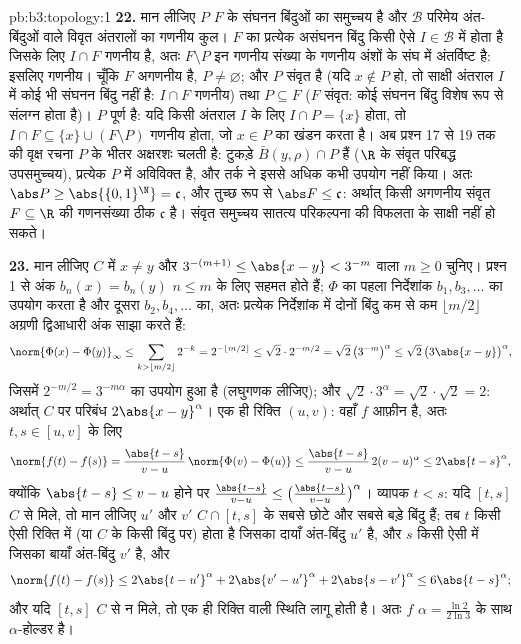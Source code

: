 \begin{solution}{pb:b3:topology:1}
\textbf{22.} मान लीजिए $P$ $F$ के संघनन बिंदुओं का समुच्चय है
और $\mathcal B$ परिमेय अंत-बिंदुओं वाले विवृत अंतरालों का गणनीय कुल। $F$
का प्रत्येक असंघनन बिंदु किसी ऐसे $I \in \mathcal B$ में होता है जिसके लिए $I \cap F$
गणनीय है, अतः $F
\setminus P$ इन गणनीय संख्या के गणनीय अंशों के संघ में
अंतर्विष्ट है: इसलिए गणनीय। चूँकि $F$ अगणनीय है, $P \neq \varnothing$; और $P$
संवृत है (यदि $x \notin P$ हो, तो साक्षी अंतराल $I$ में कोई भी संघनन
बिंदु नहीं है: $I \cap F$ गणनीय) तथा $P \subseteq F$ ($F$ संवृत: कोई संघनन बिंदु
विशेष रूप से संलग्न होता है)। $P$ पूर्ण है: यदि किसी अंतराल $I$
के लिए $I \cap P = \{x\}$ होता, तो $I \cap F \subseteq \{x\} \cup (F \setminus P)$ गणनीय होता, जो $x \in P$ का खंडन करता है।
अब प्रश्न 17 से 19 तक की वृक्ष रचना $P$ के भीतर अक्षरशः चलती है:
टुकड़े $\bar B(y, \rho) \cap P$  हैं ($\R$ के संवृत परिबद्ध उपसमुच्चय), प्रत्येक
 $P$ में अविविक्त है, और तर्क ने इससे अधिक कभी उपयोग नहीं
किया। अतः $\abs P \geq
\abs{\{0,1\}^\N} = \mathfrak c$, और तुच्छ रूप से $\abs F \leq \mathfrak
c$: अर्थात् किसी अगणनीय संवृत
$F \subseteq \R$ की गणनसंख्या ठीक $\mathfrak c$ है। संवृत समुच्चय सातत्य परिकल्पना की
विफलता के साक्षी नहीं हो सकते।

\textbf{23.} मान लीजिए $C$ में $x \neq y$ और $3^{-(m+1)} \leq \abs{x - y} < 3^{-m}$ वाला $m \geq 0$ चुनिए।
प्रश्न 1 से अंक $b_n(x) = b_n(y)$ $n \leq m$ के लिए सहमत होते हैं; $\Phi$ का पहला
निर्देशांक $b_1, b_3, \dots$ का उपयोग करता है और दूसरा $b_2,
b_4, \dots$ का, अतः प्रत्येक
निर्देशांक में दोनों बिंदु कम से कम $\lfloor m/2\rfloor$ अग्रणी द्विआधारी अंक साझा
करते हैं:
\[
\norm{\Phi(x) - \Phi(y)}_\infty
\leq \sum_{k > \lfloor m/2\rfloor}2^{-k}
= 2^{-\lfloor m/2\rfloor} \leq \sqrt2\cdot2^{-m/2}
= \sqrt2\,\bigl(3^{-m}\bigr)^\alpha
\leq \sqrt2\,\bigl(3\abs{x-y}\bigr)^\alpha,
\]
जिसमें $2^{-m/2} = 3^{-m\alpha}$ का उपयोग हुआ है (लघुगणक लीजिए); और $\sqrt2\cdot3^\alpha = \sqrt2\cdot\sqrt2 = 2$: अर्थात् $C$
पर परिबंध $2\abs{x-y}^\alpha$। एक ही रिक्ति $(u, v)$: वहाँ $f$ आफ़ीन है, अतः $t, s \in [u, v]$
के लिए
\[
\norm{f(t) - f(s)} = \frac{\abs{t-s}}{v-u}\,
\norm{\Phi(v) - \Phi(u)}
\leq \frac{\abs{t-s}}{v-u}\,2(v-u)^\alpha
\leq 2\abs{t-s}^\alpha,
\]
क्योंकि $\abs{t-s} \leq v - u$ होने पर $\frac{\abs{t-s}}{v-u} \leq \bigl(\frac{\abs{t-s}}
{v-u}\bigr)^\alpha$। व्यापक $t <
s$: यदि $[t, s]$ $C$ से मिले,
तो मान लीजिए $u'$ और $v'$  $C \cap [t, s]$ के सबसे छोटे और सबसे बड़े
बिंदु हैं; तब $t$ किसी ऐसी रिक्ति में (या $C$ के किसी बिंदु पर)
होता है जिसका दायाँ अंत-बिंदु $u'$ है, और $s$ किसी ऐसी में जिसका
बायाँ अंत-बिंदु $v'$ है, और
\[
\norm{f(t) - f(s)} \leq 2\abs{t - u'}^\alpha
+ 2\abs{v' - u'}^\alpha + 2\abs{s - v'}^\alpha
\leq 6\abs{t - s}^\alpha ;
\]
और यदि $[t, s]$ $C$ से न मिले, तो एक ही रिक्ति वाली स्थिति लागू होती
है। अतः $f$ $\alpha = \frac{\ln2}{2\ln3}$ के साथ $\alpha$-होल्डर है।


\end{solution}
